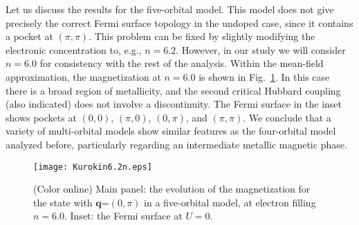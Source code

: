 \documentclass[aps,prb,superscriptaddress,preprintnumbers,
showpacs,legalpaper,twoside,twocolumn,amsmath,amssymb]{revtex4}
\begin{document}
Let us discuss the results for the five-orbital model.\cite{kuroki}
This model does not give precisely the correct Fermi surface
topology in the undoped case, since it contains a pocket at $(\pi,\pi)$.
This problem can be fixed by slightly modifying the electronic concentration to, e.g., $n=6.2$.
However, in our study we will consider $n=6.0$ for consistency
with the rest of the analysis.
Within the mean-field approximation, the magnetization at
$n=6.0$ is shown in Fig.~\ref{F.Kurokin6.2}. In this case there is a broad region
of metallicity, and the second critical Hubbard coupling (also indicated)
does not involve a discontinuity.
The Fermi
surface in the inset shows pockets at $(0,0)$, $(\pi,0)$, $(0,\pi)$, and $(\pi,\pi)$.
We conclude that a variety of multi-orbital models show similar
features as the four-orbital model analyzed before, particularly
regarding an intermediate metallic magnetic phase.

\begin{figure}[h]
\begin{center}
\vskip -0.7cm
\centerline{\texttt{[image: Kurokin6.2n.eps]}}
\vskip -0.5cm
%
\caption{(Color online) Main panel: the evolution of the magnetization
for the state with $\mathbf{q}$=$(0,\pi)$ in a five-orbital
model,\cite{kuroki} at electron filling $n=6.0$. Inset: the Fermi surface at $U=0$.}
\vskip -0.8cm
\label{F.Kurokin6.2}
\end{center}
\end{figure}
\end{document}
